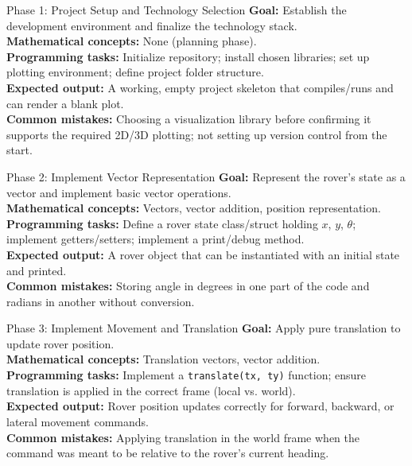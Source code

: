 \documentclass[12pt]{report}
\begin{document}
\begin{phasebox}{Phase 1: Project Setup and Technology Selection}
\textbf{Goal:} Establish the development environment and finalize the technology stack. \\
\textbf{Mathematical concepts:} None (planning phase). \\
\textbf{Programming tasks:} Initialize repository; install chosen libraries; set up plotting environment; define project folder structure. \\
\textbf{Expected output:} A working, empty project skeleton that compiles/runs and can render a blank plot. \\
\textbf{Common mistakes:} Choosing a visualization library before confirming it supports the required 2D/3D plotting; not setting up version control from the start.
\end{phasebox}

\begin{phasebox}{Phase 2: Implement Vector Representation}
\textbf{Goal:} Represent the rover's state as a vector and implement basic vector operations. \\
\textbf{Mathematical concepts:} Vectors, vector addition, position representation. \\
\textbf{Programming tasks:} Define a rover state class/struct holding $x$, $y$, $\theta$; implement getters/setters; implement a print/debug method. \\
\textbf{Expected output:} A rover object that can be instantiated with an initial state and printed. \\
\textbf{Common mistakes:} Storing angle in degrees in one part of the code and radians in another without conversion.
\end{phasebox}

\begin{phasebox}{Phase 3: Implement Movement and Translation}
\textbf{Goal:} Apply pure translation to update rover position. \\
\textbf{Mathematical concepts:} Translation vectors, vector addition. \\
\textbf{Programming tasks:} Implement a \texttt{translate(tx, ty)} function; ensure translation is applied in the correct frame (local vs. world). \\
\textbf{Expected output:} Rover position updates correctly for forward, backward, or lateral movement commands. \\
\textbf{Common mistakes:} Applying translation in the world frame when the command was meant to be relative to the rover's current heading.
\end{phasebox}
\end{document}
